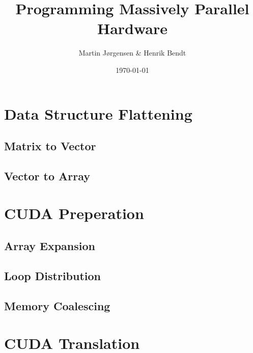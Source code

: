 \documentclass[xcolor=x11names,compress]{beamer}
\begin{document}
\title{Programming Massively Parallel Hardware} 
\author{
    Martin Jørgensen \& Henrik Bendt
} 
\date{\today} 

\frame{\titlepage} 



\section{Data Structure Flattening}

\subsection{Matrix to Vector}

\subsection{Vector to Array}


\section{CUDA Preperation}
\subsection{Array Expansion}

\subsection{Loop Distribution}

\subsection{Memory Coalescing}



\section{CUDA Translation}

\end{document}
